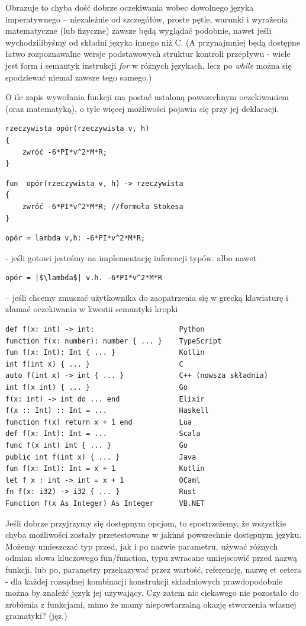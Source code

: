 Obrazuje to chyba dość dobrze oczekiwania wobec dowolnego języka imperatywnego – niezależnie od szczegółów, proste pętle, warunki i wyrażenia matematyczne (lub fizyczne) zawsze będą wyglądać podobnie, nawet jeśli wychodzilibyśmy od składni języka innego niż C. (A przynajmniej będą dostępne łatwo rozpoznawalne wersje podstawowych struktur kontroli przepływu - wiele jest form i semantyk instrukcji \textit{for} w różnych językach, lecz po \textit{while} można się spodziewać niemal zawsze tego samego.)

O ile zapis wywołania funkcji ma postać ustaloną powszechnym oczekiwaniem (oraz matematyką), o tyle więcej możliwości pojawia się przy jej deklaracji.
\begin{lstlisting}
rzeczywista opór(rzeczywista v, h)
{
	zwróć -6*PI*v^2*M*R;
}
\end{lstlisting}

\begin{lstlisting}
fun  opór(rzeczywista v, h) -> rzeczywista
{
	zwróć -6*PI*v^2*M*R; //formuła Stokesa
}
\end{lstlisting}
\begin{lstlisting}
opór = lambda v,h: -6*PI*v^2*M*R;\end{lstlisting} - jeśli gotowi jesteśmy na implementację inferencji typów.
albo nawet 
\lstset{
    escapechar=|,
    breaklines=true
}
\begin{lstlisting}
opór = |$\lambda$| v.h. -6*PI*v^2*M*R\end{lstlisting} – jeśli chcemy zmuszać użytkownika do zaopatrzenia się w grecką klawiaturę i złamać oczekiwania w kwestii semantyki kropki
\lstset{
    escapechar=@
    breaklines=true
}
\begin{lstlisting}
def f(x: int) -> int:               	 Python
function f(x: number): number { ... }    TypeScript
fun f(x: Int): Int { ... }          	 Kotlin
int f(int x) { ... }                	 C
auto f(int x) -> int { ... }        	 C++ (nowsza składnia)
int f(x int) { ... }                	 Go
f(x: int) -> int do ... end         	 Elixir
f(x :: Int) :: Int = ...            	 Haskell
function f(x) return x + 1 end      	 Lua
def f(x: Int): Int = ...            	 Scala
func f(x int) int { ... }           	 Go
public int f(int x) { ... }         	 Java
fun f(x: Int): Int = x + 1          	 Kotlin
let f x : int -> int = x + 1        	 OCaml
fn f(x: i32) -> i32 { ... }         	 Rust
Function f(x As Integer) As Integer 	 VB.NET
\end{lstlisting}
\lstset{
    escapechar=|,
    breaklines=true
}
Jeśli dobrze przyjrzymy się dostępnym opcjom, to spostrzeżemy, że wszystkie chyba możliwości zostały przetestowane w jakimś powszechnie dostępnym języku. Możemy umieszczać typ przed, jak i po nazwie parametru, używać różnych odmian słowa kluczowego fun/function, typu zwracane umiejscowić przed nazwą funkcji, lub po, parametry przekazywać przez wartość, referencję, nazwę et cetera - dla każdej rozsądnej kombinacji konstrukcji składniowych prawdopodobnie można by znaleźć język jej używający.
Czy zatem nic ciekawego nie pozostało do zrobienia z funkcjami, mimo że mamy niepowtarzalną okazję stworzenia własnej gramatyki? (jęz.)

